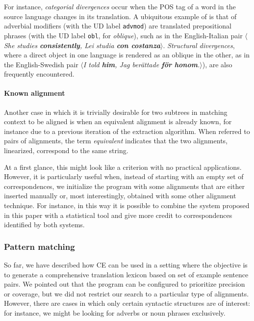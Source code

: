\documentclass[11pt]{article}
\begin{document}
For instance, \textit{categorial divergences} occur when the POS tag of a word in the source language changes in its translation.
A ubiquitous example of is that of adverbial modifiers (with the UD label \texttt{advmod}) are translated prepositional phrases (with the UD label \texttt{obl}, for \textit{oblique}), such as in the English-Italian pair $\langle$\textit{She studies \textbf{consistently}, Lei studia \textbf{con costanza}}$\rangle$.
\textit{Structural divergences}, where a direct object in one language is rendered as an oblique in the other, as in the English-Swedish pair $\langle$\textit{I told \textbf{him}, Jag berättade \textbf{för honom}.}$\rangle$), are also frequently encountered.


\paragraph{Known alignment} \label{ka}
Another case in which it is trivially desirable for two subtrees in matching context to be aligned is when an equivalent alignment is already known, for instance due to a previous iteration of the extraction algorithm. 
When referred to pairs of alignments, the term \textit{equivalent} indicates that the two alignments, linearized, correspond to the same string.

At a first glance, this might look like a criterion with no practical applications. 
However, it is particularly useful when, instead of starting with an empty set of correspondences, we initialize the program with some alignments that are either inserted manually or, most interestingly, obtained with some other alignment technique. 
For instance, in this way it is possible to combine the system proposed in this paper with a statistical tool and give more credit to correspondences identified by both systems.

\subsubsection{Pattern matching}
So far, we have described how CE can be used in a setting where the objective is to generate a comprehensive translation lexicon based on set of example sentence pairs.
We pointed out that the program can be configured to prioritize precision or coverage, but we did not restrict our search to a particular type of alignments.
However, there are cases in which only certain syntactic structures are of interest: for instance, we might be looking for adverbs or noun phrases exclusively.
\end{document}
